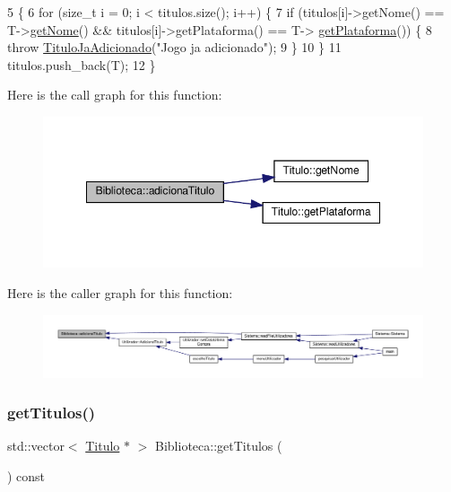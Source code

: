 \begin{DoxyCode}
5                                           \{
6     \textcolor{keywordflow}{for} (\textcolor{keywordtype}{size\_t} i = 0; i < titulos.size(); i++) \{
7         \textcolor{keywordflow}{if} (titulos[i]->getNome() == T->\hyperlink{classTitulo_acb79279860b3404c6419697df5f860cb}{getNome}() && titulos[i]->getPlataforma() == T->
      \hyperlink{classTitulo_a2a57a31d40c5df012b3c6e2451c253dd}{getPlataforma}()) \{
8             \textcolor{keywordflow}{throw} \hyperlink{classTituloJaAdicionado}{TituloJaAdicionado}(\textcolor{stringliteral}{"Jogo ja adicionado"});
9         \}
10     \}
11     titulos.push\_back(T);
12 \}
\end{DoxyCode}
Here is the call graph for this function\+:
\nopagebreak
\begin{figure}[H]
\begin{center}
\leavevmode
\includegraphics[width=348pt]{classBiblioteca_af10c9f23d85db8e03ae2e8b9d3e593e1_cgraph}
\end{center}
\end{figure}
Here is the caller graph for this function\+:
\nopagebreak
\begin{figure}[H]
\begin{center}
\leavevmode
\includegraphics[width=350pt]{classBiblioteca_af10c9f23d85db8e03ae2e8b9d3e593e1_icgraph}
\end{center}
\end{figure}
\mbox{\label{classBiblioteca_a03c1ebf76a4ace4f57000bb99a87bb88}} 
\subsubsection{\texorpdfstring{get\+Titulos()}{getTitulos()}}
{\footnotesize\ttfamily std\+::vector$<$ \hyperlink{classTitulo}{Titulo} $\ast$ $>$ Biblioteca\+::get\+Titulos (\begin{DoxyParamCaption}{ }\end{DoxyParamCaption}) const}



